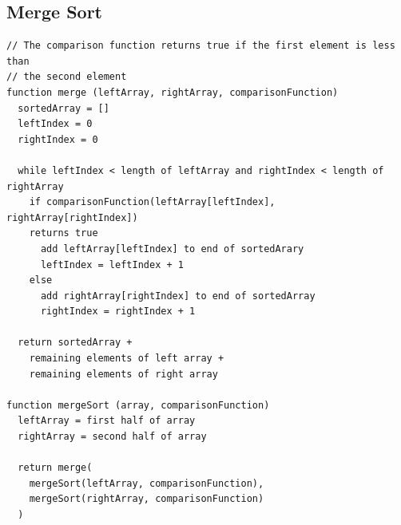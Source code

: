 \documentclass[12pt]{report}
\begin{document}
\subsection*{Merge Sort}
\begin{verbatim}
// The comparison function returns true if the first element is less than
// the second element
function merge (leftArray, rightArray, comparisonFunction)
  sortedArray = []
  leftIndex = 0
  rightIndex = 0

  while leftIndex < length of leftArray and rightIndex < length of rightArray
    if comparisonFunction(leftArray[leftIndex], rightArray[rightIndex])
    returns true
      add leftArray[leftIndex] to end of sortedArary
      leftIndex = leftIndex + 1
    else
      add rightArray[rightIndex] to end of sortedArray
      rightIndex = rightIndex + 1

  return sortedArray +
    remaining elements of left array +
    remaining elements of right array

function mergeSort (array, comparisonFunction)
  leftArray = first half of array
  rightArray = second half of array

  return merge(
    mergeSort(leftArray, comparisonFunction),
    mergeSort(rightArray, comparisonFunction)
  )
\end{verbatim}

\newpage
\end{document}
